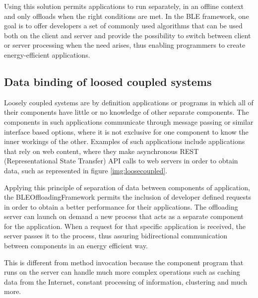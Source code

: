 	Using this solution permits applications to run separately, in an offline context and only offloads when the right conditions are met. In the BLE framework, one goal is to offer developers a set of commonly used algorithms that can be used both on the client and server and provide the possibility to switch between client or server processing when the need arises, thus enabling programmers to create energy-efficient applications.
	

\subsection{Data binding of loosed coupled systems}

	Loosely coupled systems are by definition applications or programs in which all of their components have little or no knowledge of other separate components. The components in such applications communicate through message passing or similar interface based options, where it is not exclusive for one component to know the inner workings of the other. Examples of such applications include applications that rely on web content, where they make asynchronous REST (Representational State Transfer) API calls to web servers in order to obtain data, such as represented in figure \ref{img:loosecoupled}.
	
	

Applying this principle of separation of data between components of application, the BLEOffloadingFramework permits the inclusion of developer defined requests in order to obtain a better performance for their applications. The offloading server can launch on demand a new process that acts as a separate component for the application. When a request for that specific application is received, the server passes it to the process, thus assuring bidirectional communication between components in an energy efficient way.

This is different from method invocation because the component program that runs on the server can handle much more complex operations such as caching data from the Internet, constant processing of information, clustering and much more.


